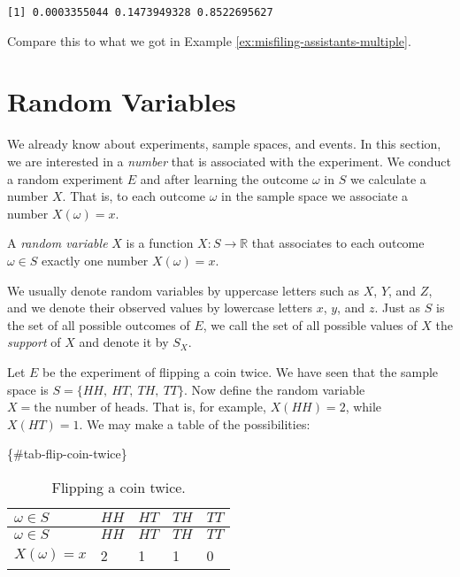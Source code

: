 \documentclass[]{book}
\numberwithin{equation}{chapter}
\numberwithin{figure}{chapter}
\theoremstyle{plain}
\theoremstyle{definition}
\theoremstyle{remark}
\theoremstyle{definition}
\theoremstyle{definition}
\theoremstyle{remark}
\let\BeginKnitrBlock\begin \let\EndKnitrBlock\end
\begin{document}
\begin{verbatim}
[1] 0.0003355044 0.1473949328 0.8522695627
\end{verbatim}

Compare this to what we got in Example
\ref{ex:misfiling-assistants-multiple}.

\section{Random Variables}\label{sec-random-variables}

We already know about experiments, sample spaces, and events. In this
section, we are interested in a \emph{number} that is associated with
the experiment. We conduct a random experiment \(E\) and after learning
the outcome \(\omega\) in \(S\) we calculate a number \(X\). That is, to
each outcome \(\omega\) in the sample space we associate a number
\(X(\omega)=x\).

\bigskip

\BeginKnitrBlock{definition}
\protect\hypertarget{def:unnamed-chunk-183}{}{\label{def:unnamed-chunk-183}}A
\emph{random variable} \(X\) is a function \(X:S\to\mathbb{R}\) that
associates to each outcome \(\omega\in S\) exactly one number
\(X(\omega)=x\).
\EndKnitrBlock{definition}

We usually denote random variables by uppercase letters such as \(X\),
\(Y\), and \(Z\), and we denote their observed values by lowercase
letters \(x\), \(y\), and \(z\). Just as \(S\) is the set of all
possible outcomes of \(E\), we call the set of all possible values of
\(X\) the \emph{support} of \(X\) and denote it by \(S_{X}\).

\bigskip

\BeginKnitrBlock{example}
\protect\hypertarget{ex:unnamed-chunk-184}{}{\label{ex:unnamed-chunk-184}}Let
\(E\) be the experiment of flipping a coin twice. We have seen that the
sample space is \(S = \{ HH,\ HT,\ TH,\ TT \}\). Now define the random
variable \(X = \mbox{the number of heads}\). That is, for example,
\(X(HH)=2\), while \(X(HT)=1\). We may make a table of the
possibilities:
\EndKnitrBlock{example}

\{\#tab-flip-coin-twice\}

\begin{longtable}[]{@{}lllll@{}}
\caption{Flipping a coin twice.}\tabularnewline
\toprule
\(\omega\in S\) & \(HH\) & \(HT\) & \(TH\) & \(TT\)\tabularnewline
\midrule
\endfirsthead
\toprule
\(\omega\in S\) & \(HH\) & \(HT\) & \(TH\) & \(TT\)\tabularnewline
\midrule
\endhead
\(X(\omega)=x\) & 2 & 1 & 1 & 0\tabularnewline
\bottomrule
\end{longtable}
\end{document}
